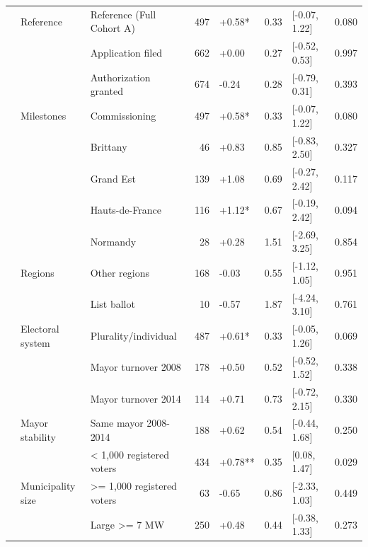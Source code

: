 \begin{ThreePartTable}
\begin{longtable}[t]{lllrllll}
\cmidrule{1-8}\pagebreak[0]
 & Reference & Reference (Full Cohort A) & 497 & +0.58* & 0.33 & {}[-0.07, 1.22] & 0.080\\
\cmidrule{2-8}\nopagebreak
 &  & Application filed & 662 & +0.00 & 0.27 & {}[-0.52, 0.53] & 0.997\\
\cmidrule{3-8}\nopagebreak
 &  & Authorization granted & 674 & -0.24 & 0.28 & {}[-0.79, 0.31] & 0.393\\
\cmidrule{3-8}\nopagebreak
 & \multirow[t]{-3}{*}{\raggedright\arraybackslash Milestones} & Commissioning & 497 & +0.58* & 0.33 & {}[-0.07, 1.22] & 0.080\\
\cmidrule{2-8}\nopagebreak
 &  & Brittany & 46 & +0.83 & 0.85 & {}[-0.83, 2.50] & 0.327\\
\cmidrule{3-8}\nopagebreak
 &  & Grand Est & 139 & +1.08 & 0.69 & {}[-0.27, 2.42] & 0.117\\
\cmidrule{3-8}\nopagebreak
 &  & Hauts-de-France & 116 & +1.12* & 0.67 & {}[-0.19, 2.42] & 0.094\\
\cmidrule{3-8}\nopagebreak
 &  & Normandy & 28 & +0.28 & 1.51 & {}[-2.69, 3.25] & 0.854\\
\cmidrule{3-8}\nopagebreak
 & \multirow[t]{-5}{*}{\raggedright\arraybackslash Regions} & Other regions & 168 & -0.03 & 0.55 & {}[-1.12, 1.05] & 0.951\\
\cmidrule{2-8}\nopagebreak
 &  & List ballot & 10 & -0.57 & 1.87 & {}[-4.24, 3.10] & 0.761\\
\cmidrule{3-8}\nopagebreak
 & \multirow[t]{-2}{*}{\raggedright\arraybackslash Electoral system} & Plurality/individual & 487 & +0.61* & 0.33 & {}[-0.05, 1.26] & 0.069\\
\cmidrule{2-8}\nopagebreak
 &  & Mayor turnover 2008 & 178 & +0.50 & 0.52 & {}[-0.52, 1.52] & 0.338\\
\cmidrule{3-8}\nopagebreak
 &  & Mayor turnover 2014 & 114 & +0.71 & 0.73 & {}[-0.72, 2.15] & 0.330\\
\cmidrule{3-8}\nopagebreak
 & \multirow[t]{-3}{*}{\raggedright\arraybackslash Mayor stability} & Same mayor 2008-2014 & 188 & +0.62 & 0.54 & {}[-0.44, 1.68] & 0.250\\
\cmidrule{2-8}\nopagebreak
 &  & < 1,000 registered voters & 434 & +0.78** & 0.35 & {}[0.08, 1.47] & 0.029\\
\cmidrule{3-8}\nopagebreak
 & \multirow[t]{-2}{*}{\raggedright\arraybackslash Municipality size} & >= 1,000 registered voters & 63 & -0.65 & 0.86 & {}[-2.33, 1.03] & 0.449\\
\cmidrule{2-8}\nopagebreak
 &  & Large >= 7 MW & 250 & +0.48 & 0.44 & {}[-0.38, 1.33] & 0.273\\

\end{longtable}
\end{ThreePartTable}
